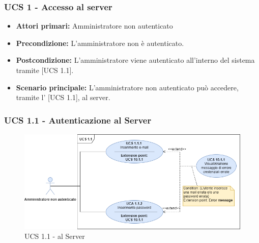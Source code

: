 \subsubsection{UCS 1 - Accesso al server}%

\begin{itemize}
\item \textbf{Attori primari:} Amministratore non autenticato
\item \textbf{Precondizione:} L'amministratore non è autenticato.
\item \textbf{Postcondizione:} L'amministratore viene autenticato all'interno del sistema tramite  [UCS 1.1].
\item \textbf{Scenario principale:} L'amministratore non autenticato può accedere, tramite l' [UCS 1.1], al server. 
\end{itemize}

\subsubsection{UCS 1.1 - Autenticazione al Server}

\begin{figure}[h]
    \centering
    \includegraphics[scale=0.6]{Sezioni/UseCase/Immagini/UCS1.1.png}
    \caption{UCS 1.1 -  al Server}
\end{figure}

